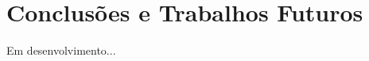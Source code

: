 \chapter{Conclusões e Trabalhos Futuros}
\label{chap:conclusoes-e-trabalhos-futuros}

Em desenvolvimento...




